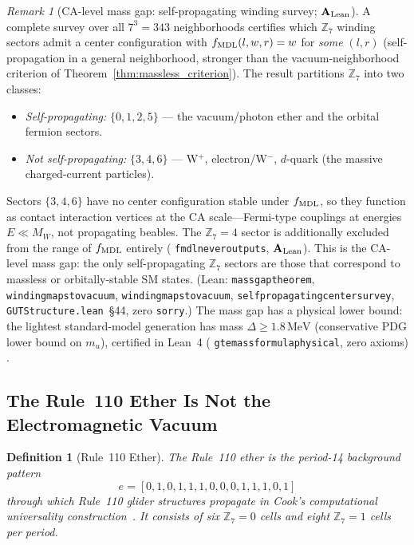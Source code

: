 \documentclass[11pt]{article}
\newtheorem{definition}[theorem]{Definition}
\theoremstyle{remark}
\newtheorem{remark}[theorem]{Remark}
\newcommand{\lean}[1]{%
  \penalty-100
  \begingroup\def\_{\textunderscore\allowbreak}\texttt{#1}\endgroup}
\newcommand{\CatAL}{\ensuremath{\textbf{A}_{\rm Lean}}}
\begin{document}
\begin{remark}[CA-level mass gap: self-propagating winding survey; $\CatAL$]
\label{rem:ca_mass_gap}
A complete survey over all $7^3 = 343$ neighborhoods certifies which $\mathbb{Z}_7$
winding sectors admit a center configuration with $f_{\rm MDL}(l,w,r) = w$
for \emph{some} $(l,r)$ (self-propagation in a general neighborhood, stronger
than the vacuum-neighborhood criterion of Theorem~\ref{thm:massless_criterion}).
The result partitions $\mathbb{Z}_7$ into two classes:
\begin{itemize}[nosep]
  \item \emph{Self-propagating:} $\{0, 1, 2, 5\}$ --- the vacuum/photon ether
    and the orbital fermion sectors.
  \item \emph{Not self-propagating:} $\{3, 4, 6\}$ --- W$^+$, electron/W$^-$,
    $d$-quark (the massive charged-current particles).
\end{itemize}
Sectors $\{3,4,6\}$ have no center configuration stable under $f_{\rm MDL}$,
so they function as contact interaction vertices at the CA scale---Fermi-type
couplings at energies $E \ll M_W$, not propagating beables.
The $\mathbb{Z}_7 = 4$ sector is additionally excluded from the range of $f_{\rm MDL}$
entirely (\lean{fmdl\_never\_outputs\_4}, $\CatAL$).
This is the CA-level mass gap: the only self-propagating $\mathbb{Z}_7$ sectors
are those that correspond to massless or orbitally-stable SM states.
(Lean: \lean{mass\_gap\_theorem}, \lean{winding\_4\_maps\_to\_vacuum},
\lean{winding\_6\_maps\_to\_vacuum}, \lean{self\_propagating\_center\_survey},
\texttt{GUTStructure.lean}~\S44, zero \texttt{sorry}.)
The mass gap has a physical lower bound: the lightest standard-model generation
has mass $\Delta \geq 1.8\,\mathrm{MeV}$ (conservative PDG lower bound on $m_u$),
certified in Lean~4 (\lean{gte\_mass\_formula\_physical}, zero axioms) \cite{SpivackEmergentGravity}.
\end{remark}

\subsection{The Rule~110 Ether Is Not the Electromagnetic Vacuum}
\label{sec:ether}

\begin{definition}[Rule~110 Ether]
\label{def:ether}
The \emph{Rule~110 ether} is the period-14 background pattern
\[
  e = [0,1,0,1,1,1,0,0,0,1,1,1,0,1]
\]
through which Rule~110 glider structures propagate in Cook's computational
universality construction~\cite{Cook2004,Wolfram2020Tech}.
It consists of six $\mathbb{Z}_7 = 0$ cells and eight $\mathbb{Z}_7 = 1$
cells per period.
\end{definition}
\end{document}
